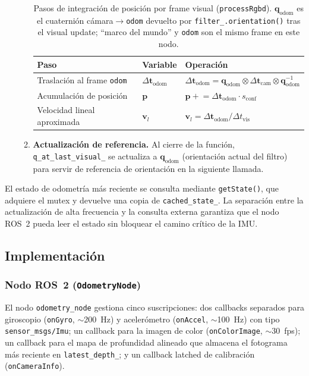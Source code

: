 \begin{itemize}
\begin{enumerate}
\begin{table}[h]
\centering
\caption{Pasos de integración de posición por frame visual
  (\texttt{processRgbd}). $\mathbf{q}_{\text{odom}}$ es el cuaternión
  cámara$\to$\texttt{odom} devuelto por \texttt{filter\_.orientation()}
  tras el visual update; ``marco del mundo'' y \texttt{odom} son el mismo
  frame en este nodo.}
\label{tab:vio-pos-integration}
\begin{tabularx}{\textwidth}{llX}
\hline
\textbf{Paso} & \textbf{Variable} & \textbf{Operación} \\
\hline
Traslación al frame \texttt{odom}
  & $\Delta\mathbf{t}_{\text{odom}}$
  & $\Delta\mathbf{t}_{\text{odom}} = \mathbf{q}_{\text{odom}} \otimes
    \Delta\mathbf{t}_{\text{cam}} \otimes \mathbf{q}_{\text{odom}}^{-1}$ \\[2pt]
Acumulación de posición
  & $\mathbf{p}$
  & $\mathbf{p} \mathrel{+}= \Delta\mathbf{t}_{\text{odom}} \cdot s_{\text{conf}}$ \\[2pt]
Velocidad lineal aproximada
  & $\mathbf{v}_l$
  & $\mathbf{v}_l = \Delta\mathbf{t}_{\text{odom}} / \Delta t_{\text{vis}}$ \\[2pt]
\hline
\end{tabularx}
\end{table}
      \item \textbf{Actualización de referencia.} Al cierre de la función,
        \texttt{q\_at\_last\_visual\_} se actualiza a $\mathbf{q}_{\text{odom}}$
        (orientación actual del filtro) para servir de referencia de
        orientación en la siguiente llamada.
    \end{enumerate}
\end{itemize}
El estado de odometría más reciente se consulta mediante \texttt{getState()},
que adquiere el mutex y devuelve una copia de \texttt{cached\_state\_}. La
separación entre la actualización de alta frecuencia y la consulta externa
garantiza que el nodo ROS~2 pueda leer el estado sin bloquear el camino
crítico de la IMU.

\subsection{Implementación}

\subsubsection{Nodo ROS~2 (\texttt{OdometryNode})}

El nodo \texttt{odometry\_node} gestiona cinco suscripciones: dos callbacks
separados para giroscopio (\texttt{onGyro}, $\sim$200~Hz) y acelerómetro
(\texttt{onAccel}, $\sim$100~Hz) con tipo \texttt{sensor\_msgs/Imu}; un
callback para la imagen de color (\texttt{onColorImage}, $\sim$30~fps); un
callback para el mapa de profundidad alineado que almacena el fotograma más
reciente en \texttt{latest\_depth\_}; y un callback latched de calibración
(\texttt{onCameraInfo}).


